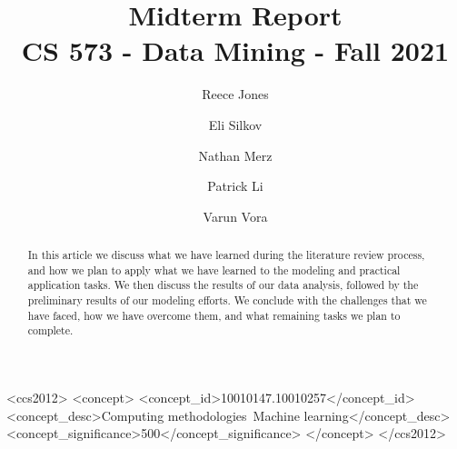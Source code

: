\documentclass[sigconf]{acmart}
\begin{document}
\title{%
  Midterm Report \\
  \large CS 573 - Data Mining - Fall 2021}

\author{Reece Jones}

\author{Eli Silkov}

\author{Nathan Merz}

\author{Patrick Li}

\author{Varun Vora}

\renewcommand{\shortauthors}{Jones, Silkov, Merz, Li, Vora}

\begin{abstract}
In this article we discuss what we have learned during the literature review process, and how we plan to apply what we have learned to the modeling and practical application tasks. We then discuss the results of our data analysis, followed by the preliminary results of our modeling efforts. We conclude with the challenges that we have faced, how we have overcome them, and what remaining tasks we plan to complete.
\end{abstract}

\begin{CCSXML}
<ccs2012>
   <concept>
       <concept_id>10010147.10010257</concept_id>
       <concept_desc>Computing methodologies~Machine learning</concept_desc>
       <concept_significance>500</concept_significance>
       </concept>
 </ccs2012>
\end{CCSXML}
\end{document}
